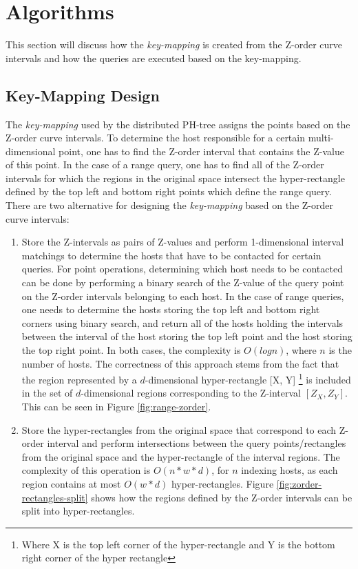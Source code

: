 \documentclass[11pt,a4paper]{globis-book}
\begin{document}
\section{Algorithms}
\label{sec:distindex-algorithms}

This section will discuss how the \textit{key-mapping} is created from the Z-order curve intervals and how the queries are executed based on the key-mapping. 
\subsection{Key-Mapping Design}

\label{sec:distindex-key-mapping}
The \textit{key-mapping} used by the distributed PH-tree assigns the points based on the Z-order curve intervals. To determine the host responsible for a certain multi-dimensional point, one has to find the Z-order interval that contains the Z-value of this point. In the case of a range query, one has to find all of the Z-order intervals for which the regions in the original space intersect the hyper-rectangle defined by the top left and bottom right points which define the range query. There are two alternative for designing the \textit{key-mapping} based on the Z-order curve intervals:
\begin{enumerate}
    \item Store the Z-intervals as pairs of Z-values and perform 1-dimensional interval matchings to determine the hosts that have to be contacted for certain queries. For point operations, determining which host needs to be contacted can be done by performing a binary search of the Z-value of the query point on the Z-order intervals belonging to each host. In the case of range queries, one needs to determine the hosts storing the top left and bottom right corners using binary search, and return all of the hosts holding the intervals between the interval of the host storing the top left point and the host storing the top right point. In both cases, the complexity is $O(logn)$, where $n$ is the number of hosts. The correctness of this approach stems from the fact that the region represented by a $d$-dimensional hyper-rectangle [X, Y] \footnote{Where X is the top left corner of the hyper-rectangle and Y is the bottom right corner of the hyper rectangle} is included in the set of $d$-dimensional regions corresponding to the Z-interval $[Z_X,Z_Y]$. This can be seen in Figure \ref{fig:range-zorder}.
    \item Store the hyper-rectangles from the original space that correspond to each Z-order interval and perform intersections between the query points/rectangles from the original space and the hyper-rectangle of the interval regions. The complexity of this operation is $O(n * w * d)$, for $n$ indexing hosts, as each region contains at most $O(w * d)$ hyper-rectangles. Figure \ref{fig:zorder-rectangles-split} shows how the regions defined by the Z-order intervals can be split into hyper-rectangles.
\end{enumerate}
\end{document}
